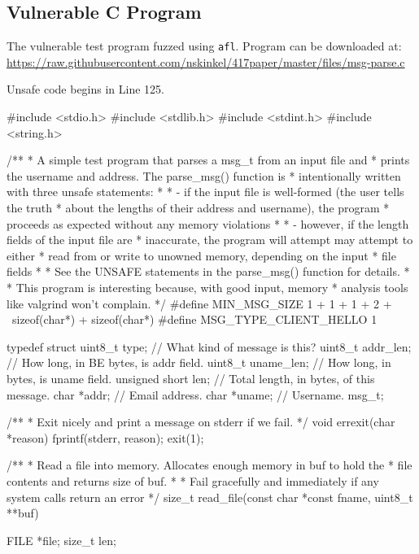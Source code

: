 \begin{appendices}

\chapter{Vulnerable C Program}
\label{app:vuln-full}

The vulnerable test program fuzzed using \texttt{afl}. Program can be
downloaded at: \url{https://raw.githubusercontent.com/nskinkel/417paper/master/files/msg-parse.c}

Unsafe code begins in Line 125.

\renewcommand\mylstcaption{Caption goes here.}
\begin{TCBlisting}[language={[ANSI]C},basicstyle=\scriptsize,caption={\mylstcaption}]
#include <stdio.h>
#include <stdlib.h>
#include <stdint.h>
#include <string.h>

/**
 * A simple test program that parses a msg_t from an input file and 
 * prints the username and address. The parse_msg() function is
 * intentionally written with three unsafe statements:
 *
 *     - if the input file is well-formed (the user tells the truth
 *       about the lengths of their address and username), the program
 *       proceeds as expected without any memory violations
 *
 *     - however, if the length fields of the input file are
 *       inaccurate, the program will attempt may attempt to either
 *       read from or write to unowned memory, depending on the input
 *       file fields
 *
 * See the UNSAFE statements in the parse_msg() function for details.
 *
 * This program is interesting because, with good input, memory
 * analysis tools like valgrind won't complain.
 */
#define MIN_MSG_SIZE 1 + 1 + 1 + 2 + \
                     sizeof(char*) + sizeof(char*)
#define MSG_TYPE_CLIENT_HELLO 1

typedef struct {
    uint8_t type;       // What kind of message is this?
    uint8_t addr_len;   // How long, in BE bytes, is addr field.
    uint8_t uname_len;  // How long, in bytes, is uname field.
    unsigned short len; // Total length, in bytes, of this message.
    char *addr;         // Email address.
    char *uname;        // Username.
} msg_t;

/**
 * Exit nicely and print a message on stderr if we fail.
 */
void
errexit(char *reason) {
    fprintf(stderr, reason);
    exit(1);
}

/**
 * Read a file into memory. Allocates enough memory in buf to hold the
 * file contents and returns size of buf.
 *
 * Fail gracefully and immediately if any system calls return an error
 */
size_t
read_file(const char *const fname, uint8_t **buf) {
   	FILE *file;
	size_t len;

}
\end{TCBlisting}
\end{appendices}
